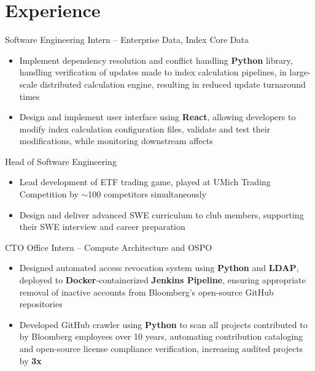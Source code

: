 \documentclass[letterpaper,11pt]{article}
\begin{document}
\section{Experience}
{Software Engineering Intern -- Enterprise Data, Index Core Data}{}
\begin{itemize}
    \item Implement dependency resolution and conflict handling \textbf{Python}
        library, handling verification of updates made to index calculation
        pipelines, in large-scale distributed calculation engine, resulting in
        reduced update turnaround times
    \item Design and implement user interface using \textbf{React}, allowing
        developers to modify index calculation configuration files, validate
        and test their modifications, while monitoring downstream affects
\end{itemize}
{Head of Software Engineering}{}
\begin{itemize}
    \item Lead development of ETF trading game, played at UMich Trading Competition
        by $\sim$100 competitors simultaneously
    \item Design and deliver advanced SWE curriculum to club members, supporting
        their SWE interview and career preparation
\end{itemize}
{CTO Office Intern -- Compute Architecture and OSPO}{}
\begin{itemize}
    \item Designed automated access revocation system using \textbf{Python} and
        \textbf{LDAP}, deployed to \textbf{Docker}-containerized
        \textbf{Jenkins Pipeline}, ensuring appropriate removal of inactive
        accounts from Bloomberg's open-source GitHub repositories
    \item Developed GitHub crawler using \textbf{Python} to scan all projects
        contributed to by Bloomberg employees over 10 years, automating
        contribution cataloging and open-source license compliance
        verification, increasing audited projects by \textbf{3x}
\end{itemize}
\end{document}
